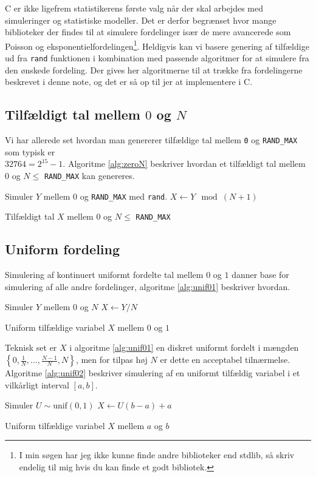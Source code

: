 C er ikke ligefrem statistikerens første valg når der skal arbejdes med simuleringer og statistiske modeller. Det er derfor begrænset hvor mange biblioteker der findes til at simulere fordelinger især de mere avancerede som Poisson og eksponentielfordelingen\footnote{I min søgen har jeg ikke kunne finde andre biblioteker end stdlib, så skriv endelig til mig hvis du kan finde et godt bibliotek.}. Heldigvis kan vi basere genering af tilfældige ud fra \texttt{rand} funktionen i kombination med passende algoritmer for at simulere fra den ønskede fordeling. Der gives her algoritmerne til at trække fra fordelingerne beskrevet i denne note, og det er så op til jer at implementere i C. 
\subsection{Tilfældigt tal mellem $0$ og $N$}
Vi har allerede set hvordan man genererer tilfældige tal mellem \texttt{0} og \texttt{RAND\_MAX} som typisk er \\ 
$32764 = 2^{15} - 1$. Algoritme \ref{alg:zeroN} beskriver hvordan et tilfældigt tal mellem $0$ og $N \leq$ \texttt{RAND\_MAX} kan genereres.
\begin{algorithm}[H]
\begin{algorithmic}
\STATE Simuler $Y$ mellem $0$ og \texttt{RAND\_MAX} med \texttt{rand}. 
\STATE $X \gets Y \mod (N + 1)$ 
\end{algorithmic}
\caption{Tilfældigt tal $X$ mellem $0$ og $N \leq$ \texttt{RAND\_MAX}} \label{alg:zeroN}
\end{algorithm}
\subsection{Uniform fordeling}
Simulering af kontinuert uniformt fordelte tal mellem $0$ og $1$ danner base for simulering af alle andre fordelinger, algoritme \ref{alg:unif01} beskriver hvordan. 
\begin{algorithm}[H]
\begin{algorithmic}
\STATE Simuler $Y$ mellem $0$ og $N$
\STATE $X \gets Y/N$
\end{algorithmic}
\caption{Uniform tilfældige variabel $X$ mellem $0$ og $1$} \label{alg:unif01}
\end{algorithm}
Teknisk set er $X$ i algoritme \ref{alg:unif01} en diskret uniformt fordelt i mængden $\left\{0, \frac{1}{N},\dots,\frac{N-1}{N},N \right\}$, men for tilpas høj $N$ er dette en acceptabel tilnærmelse. Algoritme \ref{alg:unif02} beskriver simulering af en uniformt tilfældig variabel i et vilkårligt interval $[a,b]$. 
\begin{algorithm}[H]
\begin{algorithmic}
\STATE Simuler $U \sim \text{unif}(0,1)$
\STATE $X \gets U(b-a) + a$
\end{algorithmic}
\caption{Uniform tilfældige variabel $X$ mellem $a$ og $b$} \label{alg:unif02}
\end{algorithm}
